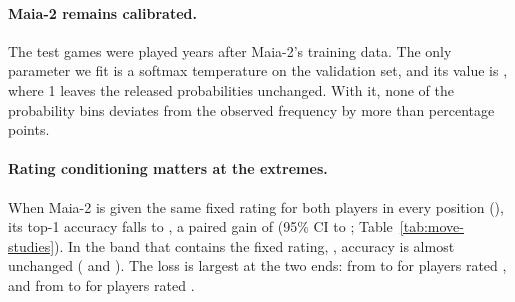 \documentclass[11pt]{article}
\begin{document}
\paragraph{Maia-2 remains calibrated.}
The test games were played years after Maia-2's training data. The only
parameter we fit is a softmax temperature on the validation set, and its
value is , where 1 leaves the released
probabilities unchanged. With it, none of the
 probability bins deviates from the
observed frequency by more than 
percentage points.

\paragraph{Rating conditioning matters at the extremes.}
When Maia-2 is given the same fixed rating for both players in every
position (), its top-1 accuracy
falls to , a paired gain of
 (95\% CI
 to
;
Table~\ref{tab:move-studies}). In the band that contains the fixed rating,
, accuracy is almost unchanged
( and
). The loss is largest at the two
ends: from  to
 for players rated
, and from  to
 for players rated
.

\begin{table}[htbp]\centering\small
{}
\caption{Human move: top-1 accuracy of each ablation model, listed under the
model it modifies, by the mover's rating.}
\label{tab:move-studies}
\end{table}
\end{document}
